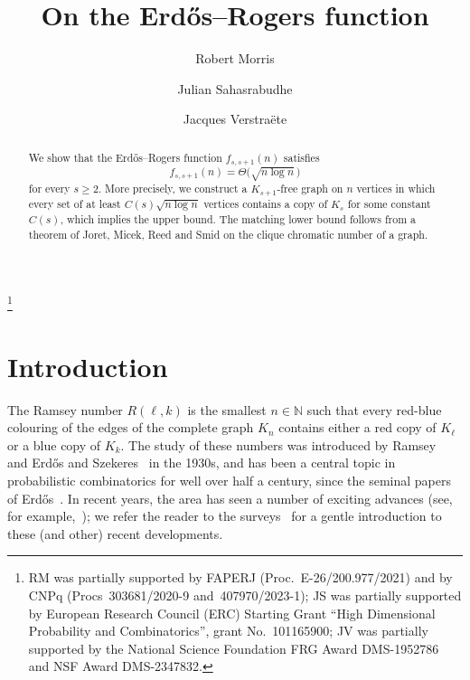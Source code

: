 \documentclass[12pt,reqno]{amsart}
\theoremstyle{remark}
\numberwithin{theorem}{section}
\renewcommand{\(}{\bigl(}
\renewcommand{\)}{\bigr)\vphantom{)}}
\renewcommand{\ge}{\geqslant}
\newcommand{\N}{\mathbb N}
\begin{document}
\title{On the Erd\H{o}s--Rogers function} 

\author{Robert Morris \and Julian Sahasrabudhe \and Jacques Verstra\"ete}

\address{IMPA, Estrada Dona Castorina 110, Jardim Bot\^anico, Rio de Janeiro, 22460-320, Brasil}

\address{Department of Pure Mathematics and Mathematical Statistics, Wilberforce Road, Cambridge, CB3 0WA, UK}

\address{Department of Mathematics, University of California, San Diego, La Jolla, CA 92093}

\thanks{RM was partially supported by FAPERJ (Proc.~E-26/200.977/2021) and by CNPq (Procs~303681/2020-9 and~407970/2023-1); JS was partially supported by European Research Council (ERC) Starting Grant “High Dimensional Probability and Combinatorics”, grant No.~101165900; JV was partially supported by the National Science Foundation FRG Award DMS-1952786 and NSF Award DMS-2347832.}

\begin{abstract}
We show that the Erd\H{o}s--Rogers function $f_{s,s+1}(n)$ satisfies 
$$f_{s,s+1}(n) = \Theta\big( \sqrt{n \log n} \, \big)$$
for every $s \ge 2$. More precisely, we construct a $K_{s+1}$-free graph on $n$ vertices in which every set of at least $C(s) \displaystyle{ \sqrt{n \log n}}$ vertices contains a copy of $K_s$ for some constant $C(s)$, which implies the upper bound. 
The matching lower bound follows from a theorem of Joret, Micek, Reed and Smid on the clique chromatic number of a graph.
\end{abstract}

\maketitle

\vspace{-2em}

\section{Introduction}

The Ramsey number $R(\ell,k)$ is the smallest $n \in \N$ such that every red-blue colouring of the edges of the complete graph $K_n$ contains either a red copy of $K_\ell$ or a blue copy of $K_k$. The study of these numbers was introduced by Ramsey~\cite{R30} and Erd\H{o}s and Szekeres~\cite{ESz} in the 1930s, and has been a central topic in probabilistic combinatorics for well over half a century, since the seminal papers of Erd\H{o}s~\cite{E47,E59,E61}. In recent years, the area has seen a number of exciting advances (see, for example,~\cite{BBCGHMST,Br26,CGMS,CJMS25,HHKP25,MaV}); we refer the reader to the surveys~\cite{ICM26,Ver26} for a gentle introduction to these (and other) recent developments. 
\end{document}
